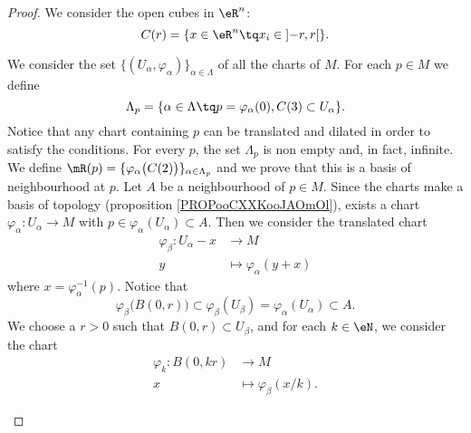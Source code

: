 \begin{proof}
	We consider the open cubes in \( \eR^n\):
	\begin{equation}
		C(r)=\{ x\in \eR^n\tq x_i\in\mathopen] -r,r\mathclose[  \}.
	\end{equation}
	\begin{subproof}

		We consider the set \( \{ (U_{\alpha}, \varphi_{\alpha}) \}_{\alpha\in\Lambda}\) of all the charts of \( M\). For each \( p\in M\) we define
		\begin{equation}
			\Lambda_p=\{ \alpha\in\Lambda\tq p=\varphi_{\alpha}(0), C(3)\subset U_{\alpha} \}.
		\end{equation}
		Notice that any chart containing \( p\) can be translated and dilated in order to satisfy the conditions. For every \( p\), the set \( \Lambda_p\) is non empty and, in fact, infinite.
		We define \( \mR(p)=\{ \varphi_{\alpha}\big( C(2) \big) \}_{\alpha\in\Lambda_p}\) and we prove that this is a basis of neighbourhood at \( p\). Let \( A\) be a neighbourhood of \( p\in M\). Since the charts make a basis of topology (proposition \ref{PROPooCXXKooJAOmOl}), exists a chart \(\varphi_{\alpha} \colon U_{\alpha}\to M  \) with \(   p\in \varphi_{\alpha}(U_{\alpha})\subset A  \). Then we consider the translated chart
		\begin{equation}
			\begin{aligned}
				\varphi_{\beta}\colon U_{\alpha}-x & \to M                         \\
				y                                  & \mapsto \varphi_{\alpha}(y+x)
			\end{aligned}
		\end{equation}
		where \( x=\varphi_{\alpha}^{-1}(p)\). Notice that
		\begin{equation}
			\varphi_{\beta}\big( B(0,r) \big)\subset \varphi_{\beta}(U_{\beta})=\varphi_{\alpha}(U_{\alpha})\subset A.
		\end{equation}
		We choose a \( r>0\) such that \( B(0,r)\subset U_{\beta}\), and for each \( k\in \eN\), we consider the chart
		\begin{equation}
			\begin{aligned}
				\varphi_k\colon B(0,kr) & \to M                         \\
				x                       & \mapsto \varphi_{\beta}(x/k).

\end{aligned}
\end{equation}
\end{subproof}
\end{proof}
